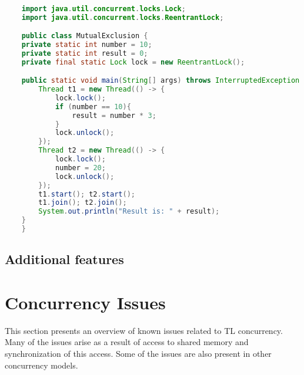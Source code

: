 \begin{lstlisting}[float,label=lst:mutualexclusion,
  caption={Mutual exclusion in Java using a lock},
  language=Java,  
  showspaces=false,
  showtabs=false,
  breaklines=true,
  showstringspaces=false,
  breakatwhitespace=true,
  commentstyle=\color{greencomments},
  keywordstyle=\color{bluekeywords},
  stringstyle=\color{redstrings}]  % Start your code-block

	import java.util.concurrent.locks.Lock;
	import java.util.concurrent.locks.ReentrantLock;

	public class MutualExclusion {
    private static int number = 10;
    private static int result = 0;
    private final static Lock lock = new ReentrantLock();

    public static void main(String[] args) throws InterruptedException {
        Thread t1 = new Thread(() -> {
            lock.lock();
            if (number == 10){
                result = number * 3;
            }
            lock.unlock();
        });
        Thread t2 = new Thread(() -> {
            lock.lock();
            number = 20;
            lock.unlock();
        });
        t1.start(); t2.start();
        t1.join(); t2.join();
        System.out.println("Result is: " + result);
    }
	}
\end{lstlisting}

\subsection{Additional features}

\section{Concurrency Issues}\label{sec:tl_ci}
This section presents an overview of known issues related to \ac{TL} concurrency. Many of the issues arise as a result of access to shared memory and synchronization of this access. Some of the issues are also present in other concurrency models.

